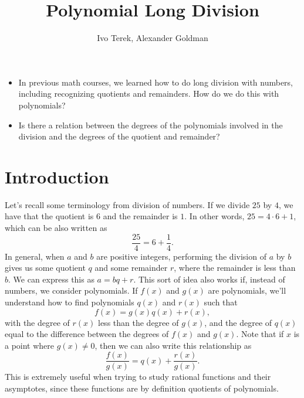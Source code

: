 \documentclass{ximera}
\author{Ivo Terek, Alexander Goldman}
\title{Polynomial Long Division}
\begin{document}
\begin{abstract}
\end{abstract}
\maketitle


\begin{motivatingQuestions}\begin{itemize}
\item In previous math courses, we learned how to do long division with numbers, including recognizing quotients and remainders. How do we do this with polynomials?
\item Is there a relation between the degrees of the polynomials involved in the division and the degrees of the quotient and remainder?
\end{itemize}\end{motivatingQuestions}



\section{Introduction}

Let's recall some terminology from division of numbers. If we divide $25$ by $4$, we have that the quotient is $6$ and the remainder is $1$. In other words, $25 = 4\cdot 6 + 1$, which can be also written as $$  \frac{25}{4} = 6+\frac{1}{4}. $$In general, when $a$ and $b$ are positive integers, performing the division of $a$ by $b$ gives us some quotient $q$ and some remainder $r$, where the remainder is less than $b$. We can express this as $a = bq+r$. This sort of idea also works if, instead of numbers, we consider polynomials. If $f(x)$ and $g(x)$ are polynomials, we'll understand how to find polynomials $q(x)$ and $r(x)$ such that $$  f(x) = g(x)q(x)+r(x),  $$with the degree of $r(x)$ less than the degree of $g(x)$, and the degree of $q(x)$ equal to the difference between the degrees of $f(x)$ and $g(x)$. Note that if $x$ is a point where $g(x) \not= 0$, then we can also write this relationship as
$$
  \frac{f(x)}{g(x)} = q(x) + \frac{r(x)}{g(x)}.
$$ This is extremely useful when trying to study rational functions and their asymptotes, since these functions are by definition quotients of polynomials. 
\end{document}
